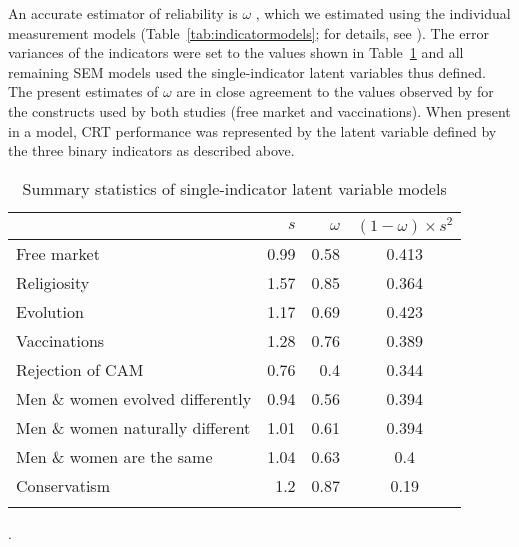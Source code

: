 \documentclass[fignum,man]{apa}\usepackage[]{graphicx}\usepackage[]{color}
\begin{document}
An accurate 
estimator of reliability 
is $\omega$ \cite{Komaroff97,Raykov97}, which
  we estimated using the individual measurement 
models (Table~\ref{tab:indicatormodels}; 
for details, see ).
The error variances of the indicators were set to 
the values shown in Table~\ref{tab:descriptives}
and all remaining SEM models used the single-indicator latent variables 
thus defined. 
The present estimates of $\omega$ are in close agreement to the values observed by 
 for the constructs used by both studies (free market and vaccinations). 
When present in a model, CRT performance was represented by the latent variable defined by the
three binary indicators as described above.

\begin{table} %
	\centering
	\caption{Summary statistics of single-indicator latent variable models}
	\label{tab:descriptives}

	\begin{tabular}{l r r c }
		\thickline
		\multicolumn{1}{c}{Construct}   & $s$ \tabfnm{\textit{a}}&  $\omega$ \tabfnm{\textit{b}}& $(1-\omega) \times s^2$ \tabfnm{\textit{c}} \\
		\hline
		Free market & 
		0.99 &
		0.58 &
		0.413 \\		
		
		Religiosity & 
		1.57 &
		0.85 &
		0.364 \\
		
		Evolution & 
		1.17 &
		0.69 &
		0.423 \\			
		
		Vaccinations & 
		1.28 &
		0.76 &
		0.389 \\		
		
        Rejection of CAM & 
		0.76 &
		0.4 &
		0.344 \\		
        
        
        Men \& women evolved differently & 
		0.94 &
		0.56 &
		0.394 \\		
        
        Men \& women naturally different & 
		1.01 &
		0.61 &
		0.394 \\		


		Men \& women are the same & 
		1.04 &
		0.63 &
		0.4 \\		
		
		Conservatism &
		1.2 &
		0.87 &
		0.19 \\		

		\thickline
	\end{tabular}
    .
\end{table}
\end{document}
